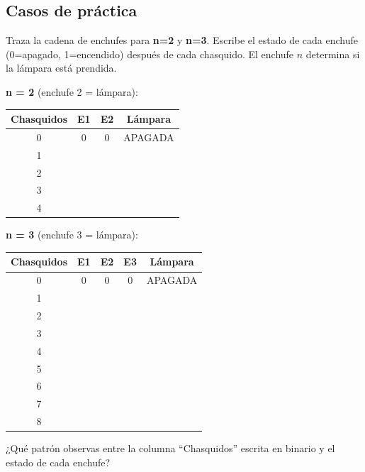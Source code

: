 \documentclass[12pt, oneside]{article}
\begin{document}
\subsection{Casos de práctica}

Traza la cadena de enchufes para \textbf{n=2} y \textbf{n=3}.
Escribe el estado de cada enchufe (0=apagado, 1=encendido) después de cada
chasquido.  El enchufe $n$ determina si la lámpara está prendida.

\textbf{n = 2} (enchufe 2 = lámpara):

\begin{center}
\begin{tabular}{c|c|c|c}
  \toprule
  \textbf{Chasquidos} & \textbf{E1} & \textbf{E2} & \textbf{Lámpara} \\
  \midrule
  0 & 0 & 0 & APAGADA \\
  1 & & & \\[4pt]
  2 & & & \\[4pt]
  3 & & & \\[4pt]
  4 & & & \\[4pt]
  \bottomrule
\end{tabular}
\end{center}

\vspace{0.5cm}

\textbf{n = 3} (enchufe 3 = lámpara):

\begin{center}
\begin{tabular}{c|c|c|c|c}
  \toprule
  \textbf{Chasquidos} & \textbf{E1} & \textbf{E2} & \textbf{E3} & \textbf{Lámpara} \\
  \midrule
  0 & 0 & 0 & 0 & APAGADA \\
  1 & & & & \\[4pt]
  2 & & & & \\[4pt]
  3 & & & & \\[4pt]
  4 & & & & \\[4pt]
  5 & & & & \\[4pt]
  6 & & & & \\[4pt]
  7 & & & & \\[4pt]
  8 & & & & \\[4pt]
  \bottomrule
\end{tabular}
\end{center}

\vspace{0.5cm}
¿Qué patrón observas entre la columna ``Chasquidos'' escrita en binario y el
estado de cada enchufe?
\end{document}
